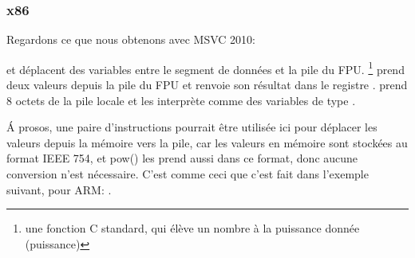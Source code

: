 \subsubsection{x86}

Regardons ce que nous obtenons avec MSVC 2010:




\FLD et \FSTP déplacent des variables entre le segment de données et la pile du FPU.
\footnote{une fonction C standard, qui élève un nombre à la puissance
donnée (puissance)} prend deux valeurs depuis la pile du FPU et renvoie son résultat
dans le registre .
\printf prend 8 octets de la pile locale et les interprète comme des variables de
type \Tdouble.

Á prosos, une paire d'instructions \MOV pourrait être utilisée ici pour déplacer
les valeurs depuis la mémoire vers la pile, car les valeurs en mémoire sont stockées
au format IEEE 754, et pow() les prend aussi dans ce format, donc aucune conversion
n'est nécessaire.
C'est comme ceci que c'est fait dans l'exemple suivant, pour ARM: .

